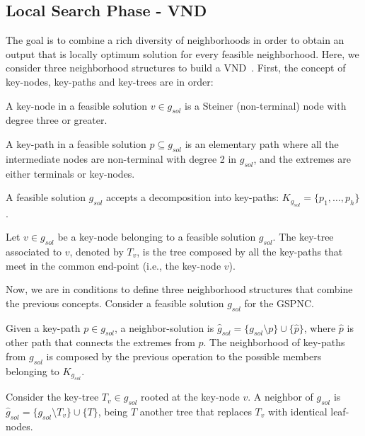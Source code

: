 \documentclass{llncs}
\begin{document}
\subsection{Local Search Phase - VND}
The goal is to combine a rich diversity of neighborhoods in order to obtain an output that is locally optimum solution for every feasible neighborhood. Here, we consider three neighborhood structures to build a VND~\cite{50}.  
First, the concept of key-nodes, key-paths and key-trees are in order: 
\begin{definition}
A key-node in a feasible solution $v \in g_{sol}$ is a Steiner (non-terminal) node with degree three or greater.
\end{definition}

\begin{definition}
A key-path in a feasible solution $p \subseteq g_{sol}$ is an elementary path 
where all the intermediate nodes are non-terminal with degree 2 in $g_{sol}$, 
and the extremes are either terminals or key-nodes.
\end{definition}

A feasible solution $g_{sol}$ accepts a decomposition into key-paths: $K_{g_{sol}}=\{p_1,\ldots,p_h\}$. 
 
\begin{definition}
Let $v \in g_{sol}$ be a key-node belonging to a feasible solution $g_{sol}$. 
The key-tree associated to $v$, denoted by $T_v$, is the tree composed by all the 
key-paths that meet in the common end-point (i.e., the key-node $v$).
\end{definition}

Now, we are in conditions to define three neighborhood structures that combine the previous concepts. 
Consider a feasible solution $g_{sol}$ for the GSPNC. 

\begin{definition}
Given a key-path $p \in g_{sol}$, a neighbor-solution is 
${\hat{g}}_{sol} = \{g_{sol} \setminus p \} \cup \{\hat{p}\}$, 
where $\hat{p}$ is other path that connects the extremes from $p$.  
The neighborhood of key-paths from $g_{sol}$ is composed by the previous operation 
to the possible members belonging to $K_{g_{sol}}$. 
\end{definition}

\begin{definition}
Consider the key-tree $T_v \in g_{sol}$ rooted at the key-node $v$.  
A neighbor of $g_{sol}$ is $\hat{g}_{sol} = \{ g_{sol}\setminus T_v \} \cup \{T\}$, being 
$T$ another tree that replaces $T_v$ with identical leaf-nodes. 
\end{definition}
\end{document}
